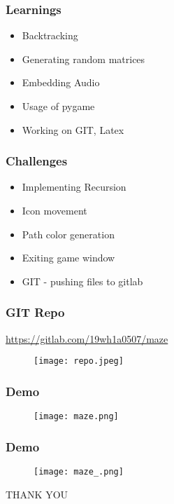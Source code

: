 \documentclass[14pt]{beamer}
\begin{document}
    \begin{frame}
        \frametitle{Learnings}
	\begin{itemize}
	    \item Backtracking 
	    \item Generating random matrices
	    \item Embedding Audio 
	    \item Usage of pygame
	    \item Working on GIT, Latex
	\end{itemize}
    \end{frame}
    \begin{frame}
	\frametitle{Challenges}
        \begin{itemize}
	    \item Implementing Recursion
	    \item Icon movement 
	    \item Path color generation 
	    \item Exiting game window 
		\item GIT - pushing files to gitlab
        \end{itemize}
    \end{frame}
    \begin{frame}
	\frametitle{GIT Repo}
	    \url{https://gitlab.com/19wh1a0507/maze}
	\begin{figure}[htp]
                        \centering
                         \texttt{[image: repo.jpeg]}
                 \end{figure}
    \end{frame}
    \begin{frame}
	\frametitle{Demo}
	     \begin{figure}[htp]
                        \centering
                         \texttt{[image: maze.png]}
                 \end{figure}	
    \end{frame}
    \begin{frame}
	\frametitle{Demo}
	     \begin{figure}[htp]
                        \centering
                         \texttt{[image: maze\_.png]}
                 \end{figure}	
    \end{frame}
    \begin{frame}
	\begin{center}
	     THANK YOU
	\end{center}
    \end{frame}
\end{document}

